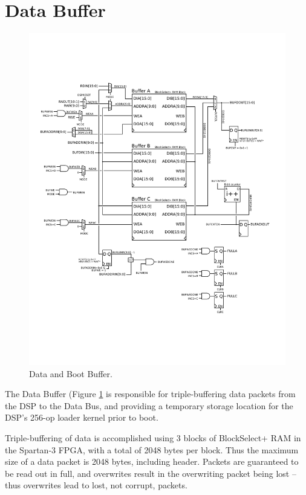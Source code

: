 
\section{Data Buffer}

\begin{figure}[h!]
  \includegraphics[scale=0.8]{databuffer.svg}
  \caption{Data and Boot Buffer.}
  \label{databuffer}
\end{figure}

The Data Buffer (Figure \ref{databuffer} is responsible for
triple-buffering data packets from the DSP to the Data Bus, and
providing a temporary storage location for the DSP's 256-op loader
kernel prior to boot.
    
Triple-buffering of data is accomplished using 3 blocks of
BlockSelect+ RAM in the Spartan-3 FPGA, with a total of 2048 bytes per
block. Thus the maximum size of a data packet is 2048 bytes, including
header. Packets are guaranteed to be read out in full, and overwrites
result in the overwriting packet being lost -- thus overwrites lead to
lost, not corrupt, packets.


